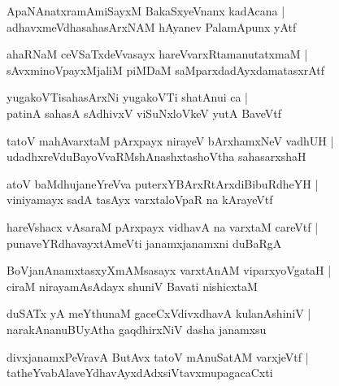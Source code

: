 \documentclass[twoside,12pt,openright]{book}
\newcounter{shloka}[chapter]
\begin{document}
\begin{shloka}%
ApaNAnatxramAmiSayxM BakaSxyeVnanx kadAcana |\\
adhavxmeVdhasahasArxNAM hAyanev PalamApunx yAtf
\end{shloka}

\begin{shloka}%
ahaRNaM ceVSaTxdeVvasayx hareVvarxRtamanutatxmaM |\\
sAvxminoVpayxMjaliM piMDaM saMparxdadAyxdamatasxrAtf
\end{shloka}

\begin{shloka}%
yugakoVTisahasArxNi yugakoVTi shatAnui ca |\\
patinA sahasA sAdhivxV viSuNxloVkeV yutA BaveVtf
\end{shloka}

\begin{shloka}%
tatoV mahAvarxtaM pArxpayx nirayeV bArxhamxNeV vadhUH |\\
udadhxreVduBayoVvaRMshAnashxtashoVtha sahasarxshaH
\end{shloka}

\begin{shloka}%
atoV baMdhujaneYreVva puterxYBArxRtArxdiBibuRdheYH |\\
viniyamayx sadA tasAyx varxtaloVpaR na kArayeVtf
\end{shloka}

\begin{shloka}%
hareVshacx vAsaraM pArxpayx vidhavA na varxtaM careVtf |\\
punaveYRdhavayxtAmeVti janamxjanamxni duBaRgA 
\end{shloka}

\begin{shloka}%
BoVjanAnamxtasxyXmAMsasayx varxtAnAM viparxyoVgataH |\\
ciraM nirayamAsAdayx shuniV Bavati nishicxtaM 
\end{shloka}

\begin{shloka}%
duSATx yA meYthunaM gaceCxVdivxdhavA kulanAshiniV |\\
narakAnanuBUyAtha gaqdhirxNiV dasha janamxsu
\end{shloka}

\begin{shloka}%
divxjanamxPeVravA ButAvx tatoV mAnuSatAM varxjeVtf |\\
tatheYvabAlaveYdhavAyxdAdxsiVtavxmupagacaCxti
\end{shloka}
\end{document}
